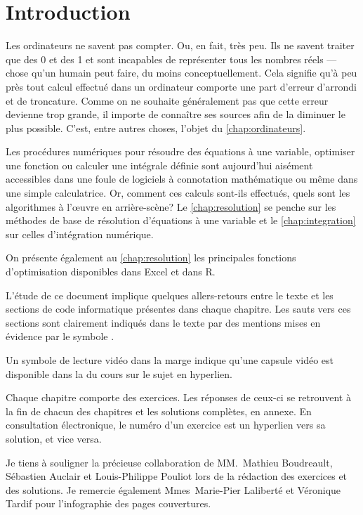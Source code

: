 \chapter*{Introduction}

Les ordinateurs ne savent pas compter. Ou, en fait, très peu. Ils ne
savent traiter que des 0 et des 1 et sont incapables de
représenter tous les nombres réels --- chose qu'un humain peut faire,
du moins conceptuellement. Cela signifie qu'à peu près tout calcul
effectué dans un ordinateur comporte une part d'erreur d'arrondi et de
troncature. Comme on ne souhaite généralement pas que cette erreur
devienne trop grande, il importe de connaître ses sources afin de la
diminuer le plus possible. C'est, entre autres choses, l'objet du
\autoref{chap:ordinateurs}.

Les procédures numériques pour résoudre des équations à une variable,
optimiser une fonction ou calculer une intégrale définie sont
aujourd'hui aisément accessibles dans une foule de logiciels à
connotation mathématique ou même dans une simple calculatrice. Or,
comment ces calculs sont-ils effectués, quels sont les algorithmes à
l'{\oe}uvre en arrière-scène? Le \autoref{chap:resolution} se
penche sur les méthodes de base de résolution d'équations à une
variable et le \autoref{chap:integration} sur celles
d'intégration numérique.

On présente également au \autoref{chap:resolution} les
principales fonctions d'optimisation disponibles dans Excel et dans R.

L'étude de ce document implique quelques allers-retours entre le texte
et les sections de code informatique présentes dans chaque chapitre.
Les sauts vers ces sections sont clairement indiqués dans le texte par
des mentions mises en évidence par le symbole {\ForwardToEnd}.

Un symbole de lecture vidéo dans la marge indique qu'une capsule vidéo
est disponible dans la %
du cours sur le sujet en hyperlien.

Chaque chapitre comporte des exercices. Les réponses de ceux-ci se
retrouvent à la fin de chacun des chapitres et les solutions
complètes, en annexe. En consultation électronique, le numéro d'un
exercice est un hyperlien vers sa solution, et vice versa.

Je tiens à souligner la précieuse collaboration de MM.~Mathieu
Boudreault, Sébastien Auclair et Louis-Philippe Pouliot lors de la
rédaction des exercices et des solutions. Je remercie également
Mmes~Marie-Pier Laliberté et Véronique Tardif pour l'infographie des
pages couvertures.

